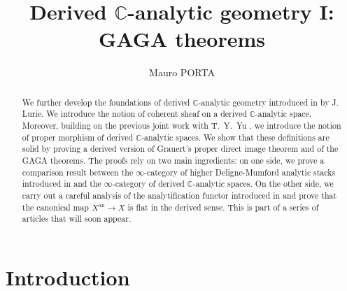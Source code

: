 \documentclass[12pt,a4paper,reqno]{amsart}
\theoremstyle{plain}
\theoremstyle{definition}
\theoremstyle{remark}
\numberwithin{equation}{section}
\begin{document}
\title{Derived $\mathbb C$-analytic geometry I: GAGA theorems}

\author{Mauro PORTA}
\address{Mauro PORTA, Institut de Math\'ematiques de Jussieu, CNRS-UMR 7586, Case 7012, Universit\'e Paris Diderot - Paris 7, B\^atiment Sophie Germain 75205 Paris Cedex 13 France}


\begin{abstract}
	We further develop the foundations of derived {$\mathbb C$-analytic\xspace} geometry introduced in \cite{DAG-IX} by J. Lurie.
	We introduce the notion of coherent sheaf on a derived {$\mathbb C$-analytic\xspace} space.
	Moreover, building on the previous joint work with T.\ Y.\ Yu \cite{Porta_Yu_Higher_analytic_stacks_2014}, we introduce the notion of proper morphism of derived {$\mathbb C$-analytic\xspace} spaces.
	We show that these definitions are solid by proving a derived version of Grauert's proper direct image theorem and of the GAGA theorems.
	The proofs rely on two main ingredients: on one side, we prove a comparison result between the $\infty$-category of higher {Deligne-Mumford\xspace} analytic stacks introduced in \cite{Porta_Yu_Higher_analytic_stacks_2014} and the $\infty$-category of derived {$\mathbb C$-analytic\xspace} spaces.
	On the other side, we carry out a careful analysis of the analytification functor introduced in \cite{DAG-IX} and prove that the canonical map $X{^\mathrm{an}} \to X$ is flat in the derived sense.
	This is part of a series of articles \cite{Porta_Comparison_2015,Porta_Analytic_deformation_2015} that will soon appear.
\end{abstract}

\maketitle

{\ignorespaces}

\tableofcontents

\section*{Introduction}
\end{document}
